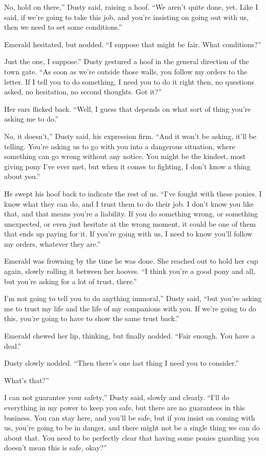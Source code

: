 \leavevmode{}No, hold on there,” Dusty said, raising a hoof. “We aren’t quite done, yet. Like I said, if we’re going to take this job, and you’re insisting on going out with us, then we need to set some conditions.”

Emerald hesitated, but nodded. “I suppose that might be fair. What conditions?”

\leavevmode{}Just the one, I suppose.” Dusty gestured a hoof in the general direction of the town gate. “As soon as we’re outside those walls, you follow my orders to the letter. If I tell you to do something, I need you to do it right then, no questions asked, no hesitation, no second thoughts. Got it?”

Her ears flicked back. “Well, I guess that depends on what sort of thing you’re asking me to do.”

\leavevmode{}No, it doesn’t,” Dusty said, his expression firm. “And it won’t be asking, it’ll be telling. You’re asking us to go with you into a dangerous situation, where something can go wrong without any notice. You might be the kindest, most giving pony I’ve ever met, but when it comes to fighting, I don’t know a thing about you.”

He swept his hoof back to indicate the rest of us. “I’ve fought with these ponies. I know what they can do, and I trust them to do their job. I don’t know you like that, and that means you’re a liability. If you do something wrong, or something unexpected, or even just hesitate at the wrong moment, it could be one of them that ends up paying for it. If you’re going with us, I need to know you’ll follow my orders, whatever they are.”

Emerald was frowning by the time he was done. She reached out to hold her cup again, slowly rolling it between her hooves. “I think you’re a good pony and all, but you’re asking for a lot of trust, there.”

\leavevmode{}I’m not going to tell you to do anything immoral,” Dusty said, “but you’re asking me to trust my life and the life of my companions with you. If we’re going to do this, you’re going to have to show the same trust back.”

Emerald chewed her lip, thinking, but finally nodded. “Fair enough. You have a deal.”

Dusty slowly nodded. “Then there’s one last thing I need you to consider.”

\leavevmode{}What’s that?”

\leavevmode{}I can not guarantee your safety,” Dusty said, slowly and clearly. “I’ll do everything in my power to keep you safe, but there are no guarantees in this business. You can stay here, and you’ll be safe, but if you insist on coming with us, you’re going to be in danger, and there might not be a single thing we can do about that. You need to be perfectly clear that having some ponies guarding you doesn’t mean this is safe, okay?”


